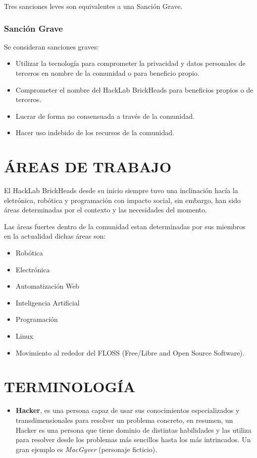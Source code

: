 \documentclass[12pt, letterpaper]{article}
\begin{document}
    Tres sanciones leves son equivalentes a una Sanción Grave.

    \subsubsection{Sanción Grave}
    Se consideran sanciones graves:
    \begin{itemize}
        \item Utilizar la tecnología para comprometer la privacidad y datos 
        personales de terceros en nombre de la comunidad o para beneficio 
        propio. 
        \item Comprometer el nombre del HackLab BrickHeads para beneficios 
        propios o de terceros.
        \item Lucrar de forma no consensuada a través de la comunidad.
        \item Hacer uso indebido de los recursos de la comunidad.
    \end{itemize}

    \section{ÁREAS DE TRABAJO}
    El HackLab BrickHeads desde su inicio siempre tuvo una inclinación hacía la 
    eletrónica, robótica y programación con impacto social, sin embargo, han 
    sido áreas determinadas por el contexto y las necesidades del momento.
    
    Las áreas fuertes dentro de la comunidad estan determinadas por sus miembros 
    en la actualidad dichas áreas son:
    \begin{itemize}
        \item Robótica
        \item Electrónica
        \item Automatización Web
        \item Inteligencia Artificial
        \item Programación
        \item Linux
        \item Movimiento al rededor del FLOSS (Free/Libre and Open Source 
        Software).
    \end{itemize}
    
    \section{TERMINOLOGÍA}
    \begin{itemize}
        \item \textbf{Hacker}, es una persona capaz de usar sus conocimientos 
        especializados y transdimensionales para resolver un problema concreto, 
        en resumen, un Hacker es una persona que tiene dominio de distintas 
        habilidades y las utiliza para resolver desde los problemas más 
        sencillos hasta los más intrincados. Un gran ejemplo es 
        \textit{MacGyver} (personaje ficticio).
    \end{itemize}
\end{document}
